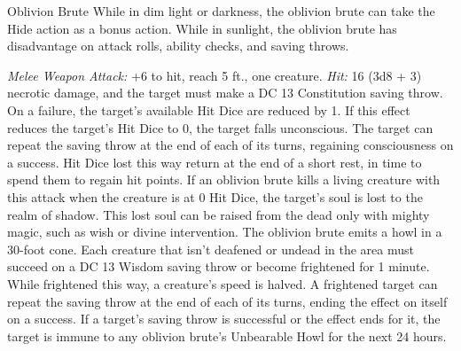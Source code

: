 \documentclass[10pt,a4paper,twoside,twocolumn,openany,bg=print,nodeprecatedcode]{dndbook}
\begin{document}
\begin{DndMonster}[float*=t]{Oblivion Brute}
\DndMonsterBasics[
armor-class = {12},
hit-points = {\DndDice{8d10 + 16}},
speed = {40 ft.}
]
\DndMonsterAbilityScores[
 str = 16,
 dex = 14,
 con = 15,
 int = 10,
 wis = 10,
 cha = 8
]
\DndMonsterDetails[
skills = {Stealth +5},
damage-vulnerabilities = {radiant},
damage-resistances = {cold; bludgeoning, piercing, slashing from nonmagical attacks},
damage-immunities = {necrotic, poison},
senses = {darkvision 60 ft., passive perception 10},
challenge = 5,
]
While in dim light or darkness, the oblivion brute can take the Hide action as a bonus action.
While in sunlight, the oblivion brute has disadvantage on attack rolls, ability checks, and saving throws.
\par
{}
\textsl{Melee Weapon Attack:} +6 to hit, reach 5 ft., one creature. \textsl{Hit:} 16 (3d8 + 3) necrotic damage, and the target must make a DC 13 Constitution saving throw. On a failure, the target's available Hit Dice are reduced by 1. If this effect reduces the target's Hit Dice to 0, the target falls unconscious. The target can repeat the saving throw at the end of each of its turns, regaining consciousness on a success. Hit Dice lost this way return at the end of a short rest, in time to spend them to regain hit points.
If an oblivion brute kills a living creature with this attack when the creature is at 0 Hit Dice, the target's soul is lost to the realm of shadow. This lost soul can be raised from the dead only with mighty magic, such as wish or divine intervention.
The oblivion brute emits a howl in a 30-foot cone. Each creature that isn't deafened or undead in the area must succeed on a DC 13 Wisdom saving throw or become frightened for 1 minute. While frightened this way, a creature's speed is halved. A frightened target can repeat the saving throw at the end of each of its turns, ending the effect on itself on a success. If a target's saving throw is successful or the effect ends for it, the target is immune to any oblivion brute's Unbearable Howl for the next 24 hours.
\end{DndMonster}


\clearpage
\end{document}
